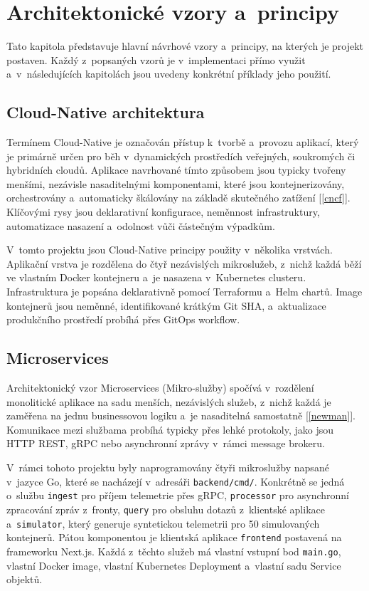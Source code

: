 \documentclass[11pt, a4paper, oneside]{article}
\begin{document}
\clearpage
\section{Architektonické vzory a~principy}

Tato kapitola představuje hlavní návrhové vzory a~principy, na kterých je projekt postaven. Každý z~popsaných vzorů je v~implementaci přímo využit a~v~následujících kapitolách jsou uvedeny konkrétní příklady jeho použití.

\subsection{Cloud-Native architektura}

Termínem Cloud-Native je označován přístup k~tvorbě a~provozu aplikací, který je primárně určen pro běh v~dynamických prostředích veřejných, soukromých či hybridních cloudů. Aplikace navrhované tímto způsobem jsou typicky tvořeny menšími, nezávisle nasaditelnými komponentami, které jsou kontejnerizovány, orchestrovány a~automaticky škálovány na základě skutečného zatížení [\ref{cncf}]. Klíčovými rysy jsou deklarativní konfigurace, neměnnost infrastruktury, automatizace nasazení a~odolnost vůči částečným výpadkům.

V~tomto projektu jsou Cloud-Native principy použity v~několika vrstvách. Aplikační vrstva je rozdělena do čtyř nezávislých mikroslužeb, z~nichž každá běží ve vlastním Docker kontejneru a~je nasazena v~Kubernetes clusteru. Infrastruktura je popsána deklarativně pomocí Terraformu a~Helm chartů. Image kontejnerů jsou neměnné, identifikované krátkým Git SHA, a~aktualizace produkčního prostředí probíhá přes GitOps workflow.

\subsection{Microservices}

Architektonický vzor Microservices (Mikro-služby) spočívá v~rozdělení monolitické aplikace na sadu menších, nezávislých služeb, z~nichž každá je zaměřena na jednu businessovou logiku a~je nasaditelná samostatně [\ref{newman}]. Komunikace mezi službama probíhá typicky přes lehké protokoly, jako jsou HTTP REST, gRPC nebo asynchronní zprávy v~rámci message brokeru.

V~rámci tohoto projektu byly naprogramovány čtyři mikroslužby napsané v~jazyce Go, které se nacházejí v~adresáři \texttt{backend/cmd/}. Konkrétně se jedná o~službu \texttt{ingest} pro příjem telemetrie přes gRPC, \texttt{processor} pro asynchronní zpracování zpráv z~fronty, \texttt{query} pro obsluhu dotazů z~klientské aplikace a~\texttt{simulator}, který generuje syntetickou telemetrii pro 50 simulovaných kontejnerů. Pátou komponentou je klientská aplikace \texttt{frontend} postavená na frameworku Next.js. Každá z~těchto služeb má vlastní vstupní bod \texttt{main.go}, vlastní Docker image, vlastní Kubernetes Deployment a~vlastní sadu Service objektů.
\end{document}
